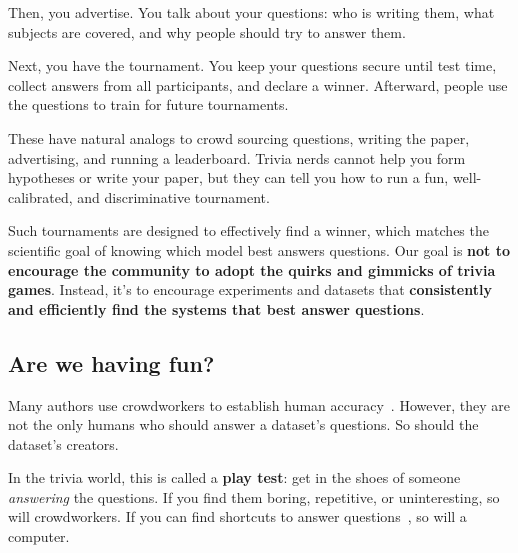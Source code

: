 Then, you advertise.  
You talk about your questions:
who is writing them, what subjects are covered, and why people should try to answer them.

Next, you have the tournament. 
You keep your questions secure until test time, collect answers from all participants, and declare a winner. 
Afterward, people use the questions to train for future tournaments.

These have natural analogs to crowd sourcing questions, writing the paper, advertising, and running a leaderboard. 
Trivia nerds cannot help you form hypotheses or write your paper, but they can tell you how to run a fun, well-calibrated, and discriminative tournament.

Such tournaments are designed to effectively find a winner, which matches the scientific goal of knowing which model best answers questions.
Our goal is {\bf not to encourage the  community to adopt the quirks and gimmicks of trivia games}.
Instead, it's to encourage experiments and datasets that {\bf consistently and efficiently find the systems that best answer questions}.

\subsection{Are we having fun?}
\label{sec:fun}

Many authors use crowdworkers to establish human accuracy~\citep{rajpurkar-16,choi-18}.
However, they are not the only humans who should answer a dataset's questions.
So should the dataset's creators.

In the trivia world, this is called a {\bf play test}:
get in the shoes of someone \emph{answering} the questions.
If you find them boring, repetitive, or uninteresting, so will
crowdworkers.
If you can find shortcuts to answer questions~\citep{rondeau-18,kaushik-18}, so will a computer.

